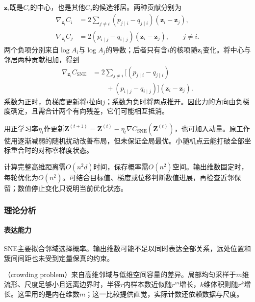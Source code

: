 $\bm{z}_i$既是$C_i$的中心，也是其他$C_j$的候选邻居。两种贡献分别为
\begin{equation}
  \label{eq:dim-sne-two-roles}
  \begin{aligned}
    \nabla_{\bm{z}_i}C_i
      &=2\sum_{j\ne i}(p_{j\mid i}-q_{j\mid i})
        (\bm{z}_i-\bm{z}_j),\\
    \nabla_{\bm{z}_i}C_j
      &=2(p_{i\mid j}-q_{i\mid j})
        (\bm{z}_i-\bm{z}_j),\qquad j\ne i.
  \end{aligned}
\end{equation}
两个负项分别来自$\log A_i$与$\log A_j$的导数；后者只有含$i$的核项随$\bm{z}_i$变化。将中心与邻居两种贡献相加，得到
\begin{equation}
  \label{eq:dim-sne-gradient}
  \begin{aligned}
    \nabla_{\bm{z}_i}C_{\mathrm{SNE}}
      &=2\sum_{j\ne i}
        \bigl[(p_{j\mid i}-q_{j\mid i})\\
      &\qquad +(p_{i\mid j}-q_{i\mid j})\bigr]
        (\bm{z}_i-\bm{z}_j).
  \end{aligned}
\end{equation}
系数为正时，负梯度更新将$i$拉向$j$；系数为负时将两点推开。因此力的方向由负梯度确定，且需合计两个有向残差，它们可能相互抵消。

用正学习率$\eta_t$作更新$\bm{Z}^{(t+1)}=\bm{Z}^{(t)}-\eta_t\nabla C_{\mathrm{SNE}}(\bm{Z}^{(t)})$，也可加入动量。原工作使用逐渐减弱的随机扰动改善布局，但未保证全局最优。小随机点云能打破全部坐标重合时的对称零梯度状态。

计算完整高维距离需$O(n^2d)$时间，保存概率需$O(n^2)$空间。输出维数固定时，每轮优化为$O(n^2)$。可结合目标值、梯度或位移判断数值进展，再检查近邻保留；数值停止变化只说明当前优化状态。

\subsubsection{理论分析}
\label{sec:dim-sne-theory}

\paragraph{表达能力}
SNE主要拟合邻域选择概率。输出维数可能不足以同时表达全部关系，远处位置和簇间间距也未受到定量保真的约束。

（crowding problem）来自高维邻域与低维空间容量的差异。局部均匀采样于$m$维流形、尺度足够小且远离边界时，半径$r$内样本数近似随$r^m$增长，$k$维体积则随$r^k$增长。这里用的是内在维数$m$；这一比较提供直觉，实际计数还依赖数据与尺度。

